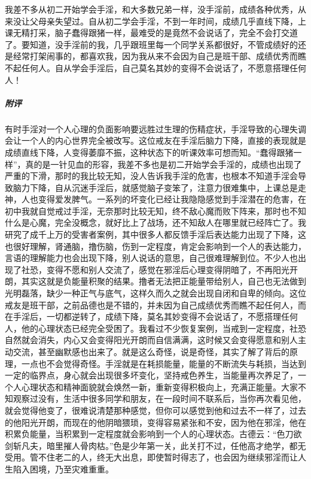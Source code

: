 \begin{case}
    我差不多从初二开始学会手淫，和大多数兄弟一样，没手淫前，成绩各种优秀，从来没让父母亲失望过。自从初二学会手淫，不到一年时间，成绩几乎直线下降，上课无精打采，脑子蠢得跟猪一样，最难受的是竟然不会说话了，完全不会打交道了。要知道，没手淫前的我，几乎跟班里每一个同学关系都很好，不管成绩好的还是经常打架闹事的，都喜欢我，因为我从来不会因为自己是班干部、成绩优秀而瞧不起任何人。自从学会手淫后，自己莫名其妙的变得不会说话了，不愿意搭理任何人！
    \subparagraph{附评} 有时手淫对一个人心理的负面影响要远胜过生理的伤精症状，手淫导致的心理失调会让一个人的内心世界完全被改写。这位戒友在手淫后脑力下降，直接的表现就是成绩直线下降，人变得萎靡不振，这种状态下的听课效率可想而知。“蠢得跟猪一样”，真的是一针见血的形容，我差不多也是初二开始学会手淫的，成绩也出现了严重的下滑，那时的我比较无知，没人告诉我手淫的危害，也根本不知道手淫会导致脑力下降，自从沉迷手淫后，就感觉脑子变笨了，注意力很难集中，上课总是走神，人也变得爱发脾气。一系列的坏变化已经让我隐隐感觉到手淫潜在的危害，在初中我就自觉戒过手淫，无奈那时比较无知，终不敌心魔而败下阵来，那时也不知什么是心魔，完全没概念，就好比上了战场，还不知敌人在哪里就已经阵亡了。我研究了成千上万的受害者案例，其中很多人都反馈手淫后表达能力出现了下降，这也很好理解，肾通脑，撸伤脑，伤到一定程度，肯定会影响到一个人的表达能力，言语的理解能力也会出现下降，别人说话的意思，自己很难理解到位。不少人也出现了社恐，变得不愿和别人交流了，感觉在邪淫后心理变得阴暗了，不再阳光开朗，其实这就是负能量积聚的结果。撸者无法把正能量带给别人，自己也无法做到光明磊落，缺少一种正气与底气，这样久而久之就会出现自闭和自卑的倾向。这位戒友是班干部，之前品德也是不错的，并未因为自己成绩优秀而瞧不起任何人，而在手淫后，一切都逆转了，成绩下降，莫名其妙变得不会说话了，不愿搭理任何人，他的心理状态已经完全受困了。我看过不少恢复案例，当戒到一定程度，社恐自然就会消失，内心又会变得阳光开朗而自信满满，这时候又会变得愿意和别人主动交流，甚至幽默感也出来了。就是这么奇怪，说是奇怪，其实了解了背后的原理，一点也不会觉得奇怪。手淫就是在耗损能量，能量的不断流失与耗损，当达到一定的临界点，身心就会出现很多坏变化，坚持戒色养生，当能量再次养足了，一个人心理状态和精神面貌就会焕然一新，重新变得积极向上，充满正能量。大家不知观察过没有，生活中很多同学和朋友，在一段时间不联系后，当你再次看见他，就会觉得他变了，很难说清楚那种感觉，但你可以感觉到他和过去不一样了，过去的他阳光开朗，而现在的他阴暗猥琐，变得容易紧张和不安，因为他在邪淫，他在积累负能量，当积累到一定程度就会影响到一个人的心理状态。古德云：“色刀欲剑斩凡夫，暗里摧人骨肉枯。”色是少年第一关，此关打不过，任他高才绝学，都无受用。管不住老二的人，终无大出息，即使暂时得志了，也会因为继续邪淫而让人生陷入困境，乃至灾难重重。
\end{case}


